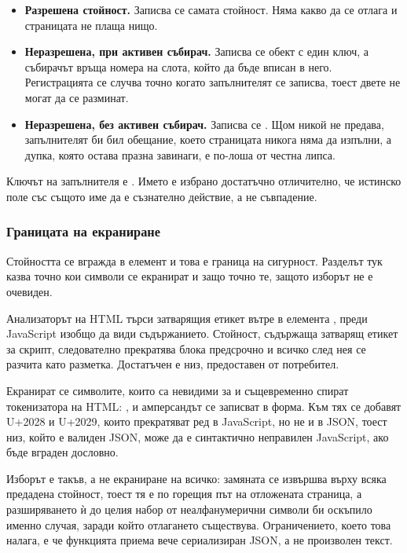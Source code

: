 \begin{itemize}
\item \textbf{Разрешена стойност.} Записва се самата стойност. Няма какво да се отлага и
страницата не плаща нищо.
\item \textbf{Неразрешена, при активен събирач.} Записва се обект с един ключ, а събирачът
връща номера на слота, който да бъде вписан в него. Регистрацията се случва точно когато
запълнителят се записва, тоест двете не могат да се разминат.
\item \textbf{Неразрешена, без активен събирач.} Записва се . Щом никой не предава,
запълнителят би бил обещание, което страницата никога няма да изпълни, а дупка, която остава
празна завинаги, е по-лоша от честна липса.
\end{itemize}

Ключът на запълнителя е . Името е избрано достатъчно отличително,
че истинско поле със същото име да е съзнателно действие, а не съвпадение.

\subsubsection{Границата на екраниране}

Стойността се вгражда в елемент  и това е граница на сигурност. Разделът тук
казва точно кои символи се екранират и защо точно те, защото изборът не е очевиден.

Анализаторът на HTML търси затварящия етикет вътре в елемента , преди JavaScript
изобщо да види съдържанието. Стойност, съдържаща затварящ етикет за скрипт, следователно
прекратява блока предсрочно и всичко след нея се разчита като разметка. Достатъчен е низ,
предоставен от потребител.

Екранират се символите, които са невидими за  и същевременно спират
токенизатора на HTML: \code{<}, \code{>} и амперсандът се записват в 
форма. Към тях се добавят U+2028 и U+2029, които прекратяват ред в JavaScript, но не и в
JSON, тоест низ, който е валиден JSON, може да е синтактично неправилен JavaScript, ако бъде
вграден дословно.

Изборът е такъв, а не екраниране на всичко: замяната се извършва върху всяка предадена
стойност, тоест тя е по горещия път на отложената страница, а разширяването ѝ до целия набор
от неалфанумерични символи би оскъпило именно случая, заради който отлагането съществува.
Ограничението, което това налага, е че функцията приема вече сериализиран JSON, а не
произволен текст.

